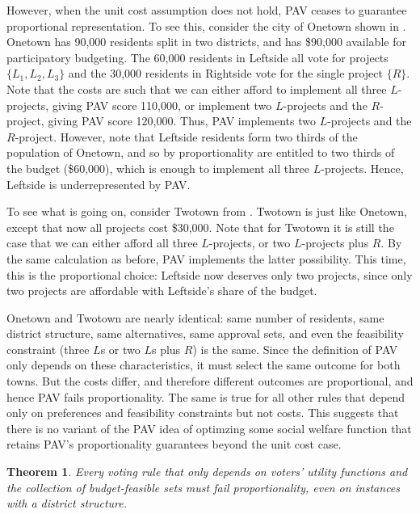 \documentclass[10pt]{scrartcl}
\theoremstyle{definition}
\theoremstyle{plain}
\newtheorem{theorem}{Theorem}
\begin{document}
However, when the unit cost assumption does not hold, PAV ceases to guarantee proportional representation. To see this, consider the city of Onetown shown in . Onetown has 90,000 residents split in two districts, and has \$90,000 available for participatory budgeting. The 60,000 residents in Leftside all vote for projects $\{L_1, L_2, L_3\}$ and the 30,000 residents in Rightside vote for the single project $\{R\}$. Note that the costs are such that we can either afford to implement all three $L$-projects, giving PAV score 110,000, or implement two $L$-projects and the $R$-project, giving PAV score 120,000. Thus, PAV implements two $L$-projects and the $R$-project. However, note that Leftside residents form two thirds of the population of Onetown, and so by proportionality are entitled to two thirds of the budget (\$60,000), which is enough to implement all three $L$-projects. Hence, Leftside is underrepresented by PAV.

To see what is going on, consider Twotown from . Twotown is just like Onetown, except that now all projects cost \$30,000. Note that for Twotown it is still the case that we can either afford all three $L$-projects, or two $L$-projects plus $R$. By the same calculation as before, PAV implements the latter possibility. This time, this is the proportional choice: Leftside now deserves only two projects, since only two projects are affordable with Leftside's share of the budget.

Onetown and Twotown are nearly identical: same number of residents, same district structure, same alternatives, same approval sets, and even the feasibility constraint (three $L$s or two $L$s plus $R$) is the same. Since the definition of PAV only depends on these characteristics, it must select the same outcome for both towns. But the costs differ, and therefore different outcomes are proportional, and hence PAV fails proportionality. The same is true for all other rules that depend only on preferences and feasibility constraints but not costs. This suggests that there is no variant of  the PAV idea of optimzing some social welfare function that retains PAV's proportionality guarantees beyond the unit cost case.

\begin{theorem}
	\label{thm:welfarist-impossibility}
	Every voting rule that only depends on voters' utility functions and the collection of budget-feasible sets must fail proportionality, even on instances with a district structure.
\end{theorem}
\end{document}
